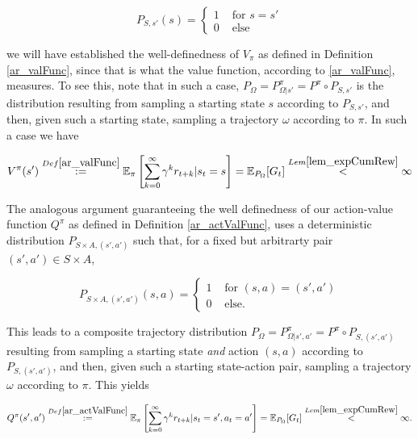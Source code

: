 \documentclass[11pt]{article} %
\begin{document}
\begin{equation}\label{eq_detStateDist}
	P_{S,s'}(s) = 	\begin{cases}
				1 & \text{ for } s = s' \\
				0 & \text{ else}
			\end{cases}
\end{equation}

we will have established the well-definedness of $V_{\pi}$ as defined in Definition \ref{ar_valFunc}, since that is what the value function, according to \ref{ar_valFunc}, measures. To see this, note that in such a case, $P_{\Omega} = P_{\Omega | s'}^{\pi} = P^{\pi} \circ P_{S,s'}$ is the distribution resulting from sampling a starting state $s$ according to $P_{S,s'}$, and then, given such a starting state, sampling a trajectory $\omega$ according to $\pi$. In such a case we have

\begin{equation}\label{eq_finiteValFunc}
	V^{\pi}(s') \overset{Def \ref{ar_valFunc}}{:=} \mathbb{E}_{\pi}\left[\sum_{k=0}^{\infty} \gamma^k r_{t+k} | s_t = s\right] = \mathbb{E}_{P_\Omega}[G_t] \overset{Lem \ref{lem_expCumRew}}{<} \infty
\end{equation}

The analogous argument guaranteeing the well definedness of our action-value function $Q^{\pi}$ as defined in Definition \ref{ar_actValFunc}, uses a deterministic distribution $P_{S \times A, (s',a')}$ such that, for a fixed but arbitrarty pair $(s',a') \in S \times A$, 

\begin{equation}\label{eq_detActStateDist}
	P_{S \times A,(s',a')}(s,a) = 	\begin{cases}
				1 & \text{ for } (s,a) = (s',a') \\
				0 & \text{ else}.
			\end{cases}
\end{equation}

This leads to a composite trajectory distribution $P_{\Omega} = P_{\Omega | s',a'}^{\pi} = P^{\pi} \circ P_{S,(s',a')}$ resulting from sampling a starting state \textit{and} action $(s,a)$ according to $P_{S,(s',a')}$, and then, given such a starting state-action pair, sampling a trajectory $\omega$ according to $\pi$. This yields

\begin{equation}\label{eq_finiteActValFunc}
	Q^{\pi}(s',a') \overset{Def \ref{ar_actValFunc}}{:= }\mathbb{E}_{\pi}\left[\sum_{k=0}^{\infty} \gamma^k r_{t+k} | s_t = s', a_t = a'\right] = \mathbb{E}_{P_\Omega}[G_t] \overset{Lem \ref{lem_expCumRew}}{<} \infty.
\end{equation}
\end{document}

